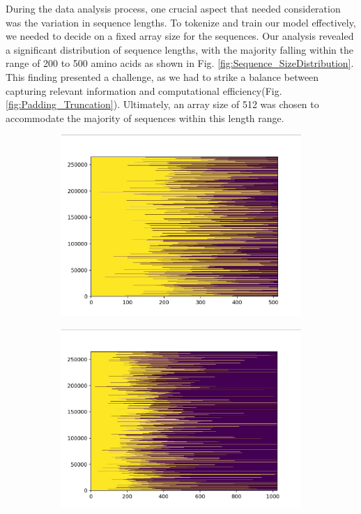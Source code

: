 \documentclass[conference]{IEEEtran}
\begin{document}
During the data analysis process, one crucial aspect that needed consideration was the variation in sequence lengths. To tokenize and train our model effectively, we needed to decide on a fixed array size for the sequences. Our analysis revealed a significant distribution of sequence lengths, with the majority falling within the range of 200 to 500 amino acids as shown in Fig. \ref*{fig:Sequence_SizeDistribution}. This finding presented a challenge, as we had to strike a balance between capturing relevant information and computational efficiency(Fig. \ref*{fig:Padding_Truncation}). Ultimately, an array size of 512 was chosen to accommodate the majority of sequences within this length range.



\begin{figure}[htp!]
  \centering
  \begin{subfigure}[b]{0.8\linewidth}
      \centering
    \includegraphics[width=0.8\linewidth]{images/XMASK_Padding_Truncation_Distribution.jpg}
    \caption{}
    \label{fig:subfig1}
  \end{subfigure}
  \vspace{0.5cm} %
  \begin{subfigure}[b]{0.8\linewidth}
      \centering
    \includegraphics[width=0.8\linewidth]{images/XMASK_Padding_Truncation_Distribution_1024.jpg}

\end{subfigure}
\end{figure}
\end{document}
